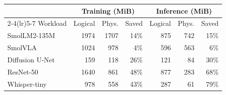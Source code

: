 \begin{tabular}{l rrr rrr}
\toprule
 & \multicolumn{3}{c}{Training (MiB)} & \multicolumn{3}{c}{Inference (MiB)} \\
\cmidrule(lr){2-4}\cmidrule(lr){5-7}
Workload & Logical & Phys. & Saved & Logical & Phys. & Saved \\
\midrule
SmolLM2-135M & 1974 & 1707 & 14\% & 875 & 742 & 15\% \\
SmolVLA & 1024 & 978 & 4\% & 596 & 563 & 6\% \\
Diffusion U-Net & 159 & 118 & 26\% & 121 & 84 & 30\% \\
ResNet-50 & 1640 & 861 & 48\% & 877 & 283 & 68\% \\
Whisper-tiny & 978 & 558 & 43\% & 287 & 61 & 79\% \\
\bottomrule
\end{tabular}
